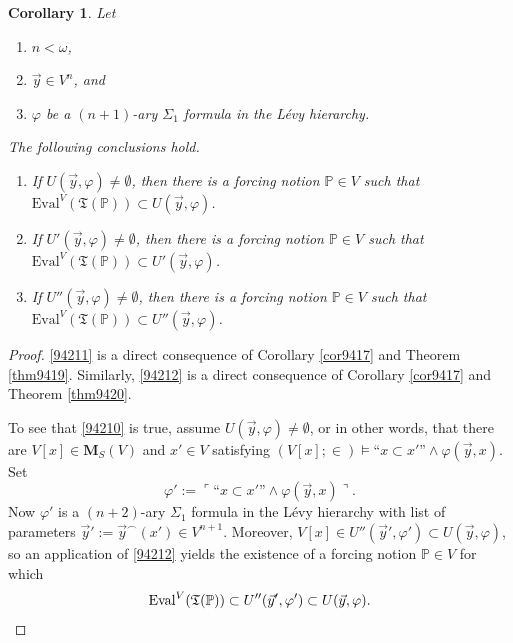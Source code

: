\documentclass[12pt, twoside]{memoir}
\numberwithin{equation}{section}
\newtheorem{cor}[thm]{Corollary}
\theoremstyle{definition}
\theoremstyle{remark}
\theoremstyle{definition}
\theoremstyle{definition}
\theoremstyle{definition}
\theoremstyle{remark}
\begin{document}
\begin{cor}
Let 
\begin{enumerate}[label=(\alph*)]
    \item $n < \omega$,
    \item $\Vec{y} \in V^n$, and
    \item $\varphi$ be a $(n + 1)$-ary $\Sigma_1$ formula in the L\'{e}vy hierarchy.
\end{enumerate}
The following conclusions hold.
\begin{enumerate}[label=(\arabic*)]
    \item\label{94210} If $U(\Vec{y}, \varphi) \neq \emptyset$, then there is a forcing notion $\mathbb{P} \in V$ such that $\mathrm{Eval}^V(\mathfrak{T}(\mathbb{P})) \subset U(\Vec{y}, \varphi)$.
    \item\label{94211} If $U'(\Vec{y}, \varphi) \neq \emptyset$, then there is a forcing notion $\mathbb{P} \in V$ such that $\mathrm{Eval}^V(\mathfrak{T}(\mathbb{P})) \subset U'(\Vec{y}, \varphi)$. 
    \item\label{94212} If $U''(\Vec{y}, \varphi) \neq \emptyset$, then there is a forcing notion $\mathbb{P} \in V$ such that $\mathrm{Eval}^V(\mathfrak{T}(\mathbb{P})) \subset U''(\Vec{y}, \varphi)$. 
\end{enumerate}
\end{cor}

\begin{proof}
\ref{94211} is a direct consequence of Corollary \ref{cor9417} and Theorem \ref{thm9419}. Similarly, \ref{94212} is a direct consequence of Corollary \ref{cor9417} and Theorem \ref{thm9420}.

To see that \ref{94210} is true, assume $U(\Vec{y}, \varphi) \neq \emptyset$, or in other words, that there are $V[x] \in \mathbf{M}_S(V)$ and $x' \in V$ satisfying $(V[x]; \in) \models \text{``} x \subset x' \text{''} \wedge \varphi (\Vec{y}, x)$. Set
\begin{equation*}
    \varphi' := \ulcorner \text{``} x \subset x' \text{''} \wedge \varphi (\Vec{y}, x) \urcorner \text{.}
\end{equation*}
Now $\varphi'$ is a $(n+2)$-ary $\Sigma_1$ formula in the L\'{e}vy hierarchy with list of parameters $\Vec{y}' := \Vec{y}^{\frown}(x') \in V^{n+1}$. Moreover, $V[x] \in U''(\Vec{y}', \varphi') \subset U(\Vec{y}, \varphi)$, so an application of \ref{94212} yields the existence of a forcing notion $\mathbb{P} \in V$ for which
\begin{equation*}
    \mathrm{Eval}^V(\mathfrak{T}(\mathbb{P})) \subset U''(\Vec{y}', \varphi') \subset U(\Vec{y}, \varphi) \text{.} \qedhere
\end{equation*}
\end{proof}
\end{document}
